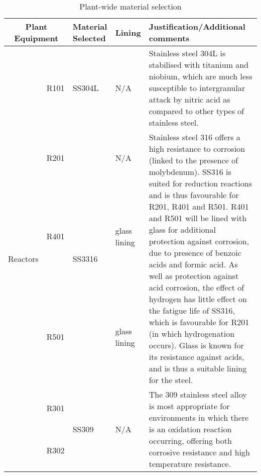 

\begin{table}[H]
\centering
\caption{Plant-wide material selection}
\label{tab:material}
\begin{tabular}{@{}p{2cm}|p{3cm}|p{2cm}|p{2cm}|p{5cm}@{}}
\toprule
\multicolumn{2}{c|}{\textbf{Plant Equipment}}                                                                    & \textbf{Material   Selected}                                                                  & \textbf{Lining}                                    & \textbf{Justification/Additional   comments}          \\ \midrule
 \multirow{6}{*}{Reactors}    & R101                                                     & SS304L                                                                                        & N/A                                                & Stainless   steel 304L is stabilised with titanium and niobium, which are much less   susceptible to intergranular attack by nitric acid as compared to other types   of stainless steel.\\
     & R201     &   \multirow{3}{*}{SS3316}      & N/A      &  \multirow{3}{*}{Stainless   steel 316 offers a high resistance to corrosion (linked to the presence of   molybdenum). SS316 is suited for reduction reactions and is thus favourable   for R201, R401 and R501. R401 and R501 will be lined with glass for additional   protection against corrosion, due to presence of benzoic acids and formic   acid. As well as protection against acid corrosion, the effect of hydrogen   has little effect on the fatigue life of SS316, which is favourable for R201   (in which hydrogenation occurs). Glass is known for its resistance against   acids, and is thus a suitable lining for the steel.}                                  \\
        & R401       &          & glass lining       &   \\
   & R501                                                     &          & glass lining                                       &  \\
    & R301        &        \multirow{2}{*}{SS309}          &  \multirow{2}{*}{N/A}     &      \multirow{2}{*}{The   309 stainless steel alloy is most appropriate for environments in which there   is an oxidation reaction occurring, offering both corrosive resistance and   high temperature resistance.}                    \\
          & R302  &                                                                       &                             &  \\ \midrule

\end{tabular}
\end{table}
